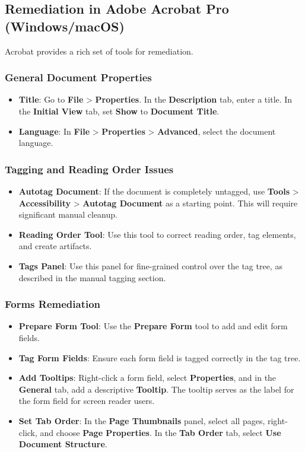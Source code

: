 \subsection{Remediation in Adobe Acrobat Pro (Windows/macOS)}
\label{subsec:remediation-in-acrobat}
Acrobat provides a rich set of tools for remediation.

\subsubsection{General Document Properties}
\label{ssubsec:general-doc-properties}
\begin{itemize}
	\item \textbf{Title}: Go to \textbf{File} > \textbf{Properties}. In the \textbf{Description} tab, enter a title. In the \textbf{Initial View} tab, set \textbf{Show} to \textbf{Document Title}.
	\item \textbf{Language}: In \textbf{File} > \textbf{Properties} > \textbf{Advanced}, select the document language.
\end{itemize}

\subsubsection{Tagging and Reading Order Issues}
\label{ssubsec:tagging-reading-order-issues}
\begin{itemize}
	\item \textbf{Autotag Document}: If the document is completely untagged, use \textbf{Tools} > \textbf{Accessibility} > \textbf{Autotag Document} as a starting point. This will require significant manual cleanup.
	\item \textbf{Reading Order Tool}: Use this tool to correct reading order, tag elements, and create artifacts.
	\item \textbf{Tags Panel}: Use this panel for fine-grained control over the tag tree, as described in the manual tagging section.
\end{itemize}

\subsubsection{Forms Remediation}
\label{ssubsec:forms-remediation}
\begin{itemize}
	\item \textbf{Prepare Form Tool}: Use the \textbf{Prepare Form} tool to add and edit form fields.
	\item \textbf{Tag Form Fields}: Ensure each form field is tagged correctly in the tag tree.
	\item \textbf{Add Tooltips}: Right-click a form field, select \textbf{Properties}, and in the \textbf{General} tab, add a descriptive \textbf{Tooltip}. The tooltip serves as the label for the form field for screen reader users.
	\item \textbf{Set Tab Order}: In the \textbf{Page Thumbnails} panel, select all pages, right-click, and choose \textbf{Page Properties}. In the \textbf{Tab Order} tab, select \textbf{Use Document Structure}.
\end{itemize}

